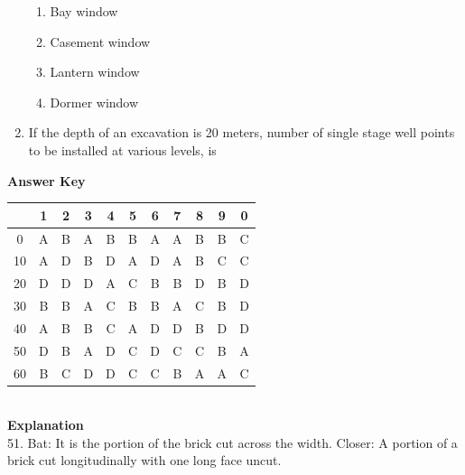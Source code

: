 \documentclass[11pt,a4paper]{article}
\begin{document}
\begin{enumerate}
\begin{enumerate}[label=\Alph*.]
\item{Bay window}
\item{Casement window}
\item{Lantern window}
\item{Dormer window}
\end{enumerate}
\item{If the depth of an excavation is 20 meters, number of single stage well points to be installed at various levels, is}
\\
\end{enumerate}
\textbf{Answer Key}
\begin{tabular}{ | c | c c c c c c c c c c | }
\hline
 & 1 & 2 & 3 & 4 & 5 & 6 & 7 & 8 & 9 & 0 \\
\hline
0 & A & B & A & B & B & A & A & B & B & C \\
10 & A & D & B & D & A & D & A & B & C & C \\
20 & D & D & D & A & C & B & B & D & B & D \\
30 & B & B & A & C & B & B & A & C & B & D \\
40 & A & B & B & C & A & D & D & B & D & D \\
50 & D & B & A & D & C & D & C & C & B & A \\
60 & B & C & D & D & C & C & B & A & A & C \\
\hline
\end{tabular}
\\\textbf{Explanation}\\
51.
Bat: It is the portion of the brick cut across the width.
Closer: A portion of a brick cut longitudinally with one long face uncut.

\clearpage
\end{document}
